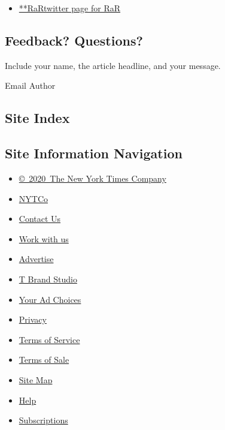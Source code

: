 \begin{itemize}
\tightlist
\item
  \href{https://twitter.com/RaR}{**RaRtwitter page for RaR}
\end{itemize}

\hypertarget{feedback-questions}{%
\subsection{Feedback? Questions?}\label{feedback-questions}}

Include your name, the article headline, and your message.

Email Author

\hypertarget{site-index}{%
\subsection{Site Index}\label{site-index}}

\hypertarget{site-information-navigation}{%
\subsection{Site Information
Navigation}\label{site-information-navigation}}

\begin{itemize}
\tightlist
\item
  \href{https://help.nytimes.com/hc/en-us/articles/115014792127-Copyright-notice}{©~2020~The
  New York Times Company}
\end{itemize}

\begin{itemize}
\tightlist
\item
  \href{https://www.nytco.com/}{NYTCo}
\item
  \href{https://help.nytimes.com/hc/en-us/articles/115015385887-Contact-Us}{Contact
  Us}
\item
  \href{https://www.nytco.com/careers/}{Work with us}
\item
  \href{https://nytmediakit.com/}{Advertise}
\item
  \href{http://www.tbrandstudio.com/}{T Brand Studio}
\item
  \href{https://www.nytimes.com/privacy/cookie-policy\#how-do-i-manage-trackers}{Your
  Ad Choices}
\item
  \href{https://www.nytimes.com/privacy}{Privacy}
\item
  \href{https://help.nytimes.com/hc/en-us/articles/115014893428-Terms-of-service}{Terms
  of Service}
\item
  \href{https://help.nytimes.com/hc/en-us/articles/115014893968-Terms-of-sale}{Terms
  of Sale}
\item
  \href{https://spiderbites.nytimes.com}{Site Map}
\item
  \href{https://help.nytimes.com/hc/en-us}{Help}
\item
  \href{https://www.nytimes.com/subscription?campaignId=37WXW}{Subscriptions}
\end{itemize}
